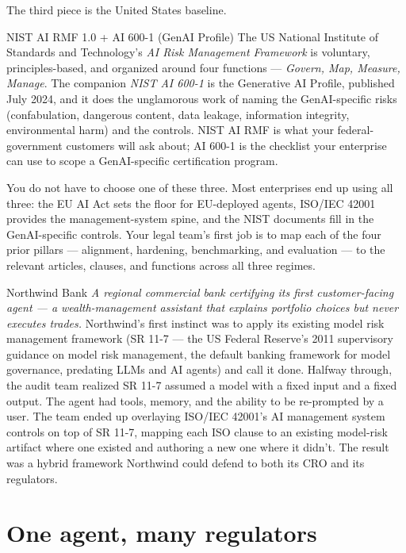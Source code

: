 The third piece is the United States baseline.

\begin{TNinpractice}{NIST AI RMF 1.0 + AI 600-1 (GenAI Profile)} The US National Institute of Standards and Technology's \textit{AI Risk Management Framework} \citep{nist-airmf-100-1} is voluntary, principles-based, and organized around four functions --- \textit{Govern, Map, Measure, Manage}. The companion \textit{NIST AI 600-1} \citep{nist-genai-600-1} is the Generative AI Profile, published July 2024, and it does the unglamorous work of naming the GenAI-specific risks (confabulation, dangerous content, data leakage, information integrity, environmental harm) and the controls. NIST AI RMF is what your federal-government customers will ask about; AI 600-1 is the checklist your enterprise can use to scope a GenAI-specific certification program. \end{TNinpractice}

You do not have to choose one of these three. Most enterprises end up using all three: the EU AI Act sets the floor for EU-deployed agents, ISO/IEC 42001 provides the management-system spine, and the NIST documents fill in the GenAI-specific controls. Your legal team's first job is to map each of the four prior pillars --- alignment, hardening, benchmarking, and evaluation --- to the relevant articles, clauses, and functions across all three regimes.

\begin{TNinpractice}{Northwind Bank} \textit{A regional commercial bank certifying its first customer-facing agent --- a wealth-management assistant that explains portfolio choices but never executes trades.} Northwind's first instinct was to apply its existing model risk management framework (SR 11-7 --- the US Federal Reserve's 2011 supervisory guidance on model risk management, the default banking framework for model governance, predating LLMs and AI agents) and call it done. Halfway through, the audit team realized SR 11-7 assumed a model with a fixed input and a fixed output. The agent had tools, memory, and the ability to be re-prompted by a user. The team ended up overlaying ISO/IEC 42001's AI management system controls on top of SR 11-7, mapping each ISO clause to an existing model-risk artifact where one existed and authoring a new one where it didn't. The result was a hybrid framework Northwind could defend to both its CRO and its regulators. \end{TNinpractice}

\section{One agent, many regulators}


